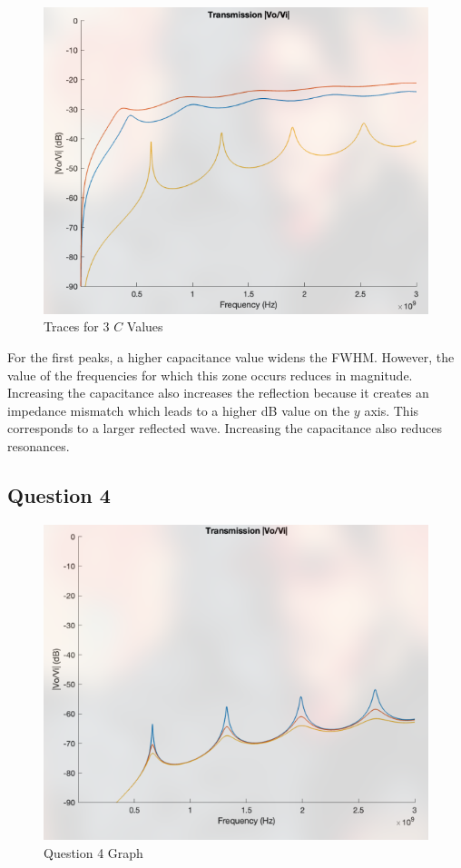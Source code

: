 \documentclass[
	letterpaper, %
	10pt, %
]{CSUniSchoolLabReport}
\begin{document}
\begin{figure}[H]
  \centering
  \includegraphics[width=.9\textwidth]{Figures/Lab Three/GraphTrio.png}
  \caption{Traces for 3 $C$ Values}
  \label{fig:3}
\end{figure}

For the first peaks, a higher capacitance value widens the FWHM. However, the value of the frequencies for which this zone occurs reduces in magnitude. Increasing the capacitance also increases the reflection because it creates an impedance mismatch which leads to a higher dB value on the $y$ axis. This corresponds to a larger reflected wave. Increasing the capacitance also reduces resonances.

\subsection{Question 4}

\begin{figure}[H]
  \centering
  \includegraphics[width=.9\textwidth]{Figures/Lab Three/ThreePeaks.png}
  \caption{Question 4 Graph}
  \label{fig:4}
\end{figure}
\end{document}

